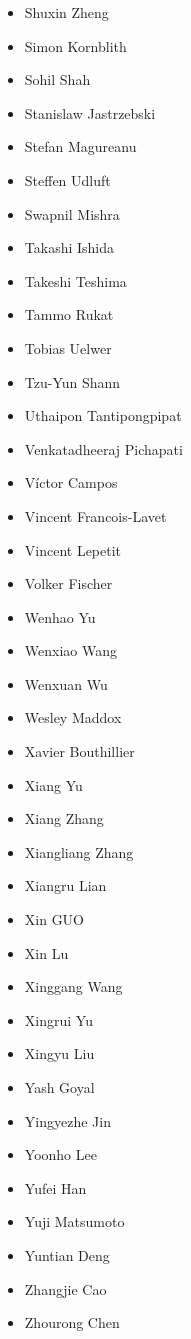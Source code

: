 \begin{multicols}{4}
\begin{itemize}[label={}]
    \item Shuxin Zheng
    \item Simon Kornblith
    \item Sohil Shah
    \item Stanislaw Jastrzebski
    \item Stefan Magureanu
    \item Steffen Udluft
    \item Swapnil Mishra
    \item Takashi Ishida
    \item Takeshi Teshima
    \item Tammo Rukat
    \item Tobias Uelwer
    \item Tzu-Yun Shann
    \item Uthaipon Tantipongpipat
    \item Venkatadheeraj Pichapati
    \item Víctor Campos
    \item Vincent Francois-Lavet
    \item Vincent Lepetit
    \item Volker Fischer
    \item Wenhao Yu
    \item Wenxiao Wang
    \item Wenxuan Wu
    \item Wesley Maddox
    \item Xavier Bouthillier
    \item Xiang Yu
    \item Xiang Zhang
    \item Xiangliang Zhang
    \item Xiangru Lian
    \item Xin GUO
    \item Xin Lu
    \item Xinggang Wang
    \item Xingrui Yu
    \item Xingyu Liu
    \item Yash Goyal
    \item Yingyezhe Jin
    \item Yoonho Lee
    \item Yufei Han
    \item Yuji Matsumoto
    \item Yuntian Deng
    \item Zhangjie Cao
    \item Zhourong Chen
\end{itemize}
\end{multicols}
\endgroup
